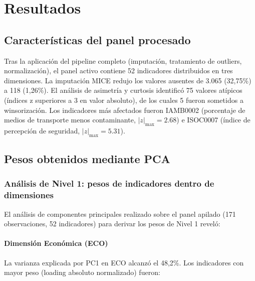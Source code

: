 
\chapter{Resultados}

\section{Características del panel procesado}

Tras la aplicación del pipeline completo (imputación, tratamiento de outliers, normalización), el panel activo contiene 52 indicadores distribuidos en tres dimensiones. La imputación MICE redujo los valores ausentes de 3.065 (32,75\%) a 118 (1,26\%). El análisis de asimetría y curtosis identificó 75 valores atípicos (índices z superiores a 3 en valor absoluto), de los cuales 5 fueron sometidos a winsorización. Los indicadores más afectados fueron IAMB0002 (porcentaje de medios de transporte menos contaminante, $|z|_{\max} = 2.68$) e ISOC0007 (índice de percepción de seguridad, $|z|_{\max} = 5.31$).

\section{Pesos obtenidos mediante PCA}

\subsection{Análisis de Nivel 1: pesos de indicadores dentro de dimensiones}

El análisis de componentes principales realizado sobre el panel apilado (171 observaciones, 52 indicadores) para derivar los pesos de Nivel 1 reveló:

\subsubsection{Dimensión Económica (ECO)}

La varianza explicada por PC1 en ECO alcanzó el 48,2\%. Los indicadores con mayor peso (loading absoluto normalizado) fueron:

